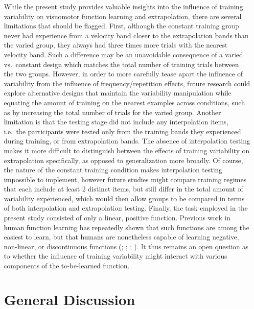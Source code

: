 \documentclass[
  11pt,
  letterpaper,
]{article}
\begin{document}
While the present study provides valuable insights into the influence of
training variability on visuomotor function learning and extrapolation,
there are several limitations that should be flagged. First, although
the constant training group never had experience from a velocity band
closer to the extrapolation bands than the varied group, they always had
three times more trials with the nearest velocity band. Such a
difference may be an unavoidable consequence of a varied vs.~constant
design which matches the total number of training trials between the two
groups. However, in order to more carefully tease apart the influence of
variability from the influence of frequency/repetition effects, future
research could explore alternative designs that maintain the variability
manipulation while equating the amount of training on the nearest
examples across conditions, such as by increasing the total number of
trials for the varied group. Another limitation is that the testing
stage did not include any interpolation items, i.e.~the participants
were tested only from the training bands they experienced during
training, or from extrapolation bands. The absence of interpolation
testing makes it more difficult to distinguish between the effects of
training variability on extrapolation specifically, as opposed to
generalization more broadly. Of course, the nature of the constant
training condition makes interpolation testing impossible to implement,
however future studies might compare training regimes that each include
at least 2 distinct items, but still differ in the total amount of
variability experienced, which would then allow groups to be compared in
terms of both interpolation and extrapolation testing. Finally, the task
employed in the present study consisted of only a linear, positive
function. Previous work in human function learning has repeatedly shown
that such functions are among the easiest to learn, but that humans are
nonetheless capable of learning negative, non-linear, or discontinuous
functions
(; ; ; ). It thus remains an open question as to whether the
influence of training variability might interact with various components
of the to-be-learned function.

\section{General Discussion}\label{general-discussion}
\end{document}
